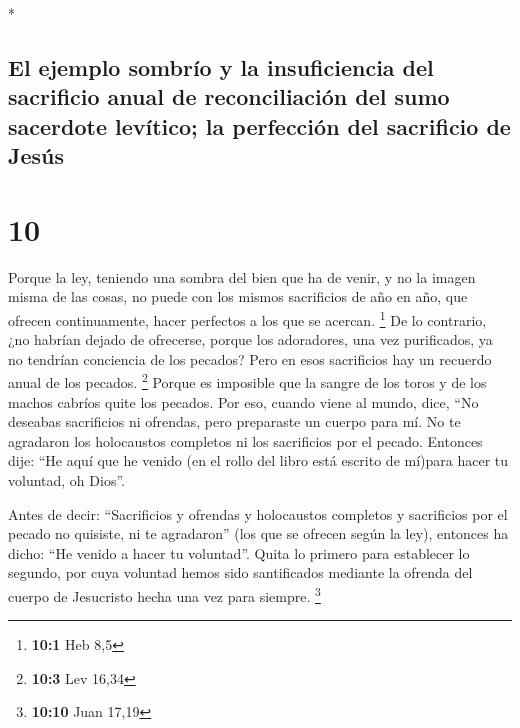 \begin{paracol}{2}
\begin{otherlanguage}{english}
\end{otherlanguage}

\switchcolumn[0]*

\hypertarget{el-ejemplo-sombruxedo-y-la-insuficiencia-del-sacrificio-anual-de-reconciliaciuxf3n-del-sumo-sacerdote-levuxedtico-la-perfecciuxf3n-del-sacrificio-de-jesuxfas}{%
\subsection{El ejemplo sombrío y la insuficiencia del sacrificio anual
de reconciliación del sumo sacerdote levítico; la perfección del
sacrificio de
Jesús}\label{el-ejemplo-sombruxedo-y-la-insuficiencia-del-sacrificio-anual-de-reconciliaciuxf3n-del-sumo-sacerdote-levuxedtico-la-perfecciuxf3n-del-sacrificio-de-jesuxfas}}

\hypertarget{section-18}{%
\section{10}\label{section-18}}

 Porque la ley, teniendo una sombra del bien que ha de
venir, y no la imagen misma de las cosas, no puede con los mismos
sacrificios de año en año, que ofrecen continuamente, hacer perfectos a
los que se acercan. \footnote{\textbf{10:1} Heb 8,5}  De
lo contrario, ¿no habrían dejado de ofrecerse, porque los adoradores,
una vez purificados, ya no tendrían conciencia de los pecados?
 Pero en esos sacrificios hay un recuerdo anual de los
pecados. \footnote{\textbf{10:3} Lev 16,34}  Porque es
imposible que la sangre de los toros y de los machos cabríos quite los
pecados.  Por eso, cuando viene al mundo, dice, ``No
deseabas sacrificios ni ofrendas, pero preparaste un cuerpo para mí.
 No te agradaron los holocaustos completos ni los
sacrificios por el pecado.  Entonces dije: ``He aquí que
he venido (en el rollo del libro está escrito de mí)para hacer tu
voluntad, oh Dios''.

 Antes de decir: ``Sacrificios y ofrendas y holocaustos
completos y sacrificios por el pecado no quisiste, ni te agradaron''
(los que se ofrecen según la ley),  entonces ha dicho:
``He venido a hacer tu voluntad''. Quita lo primero para establecer lo
segundo,  por cuya voluntad hemos sido santificados
mediante la ofrenda del cuerpo de Jesucristo hecha una vez para siempre.
\footnote{\textbf{10:10} Juan 17,19}


\end{paracol}
